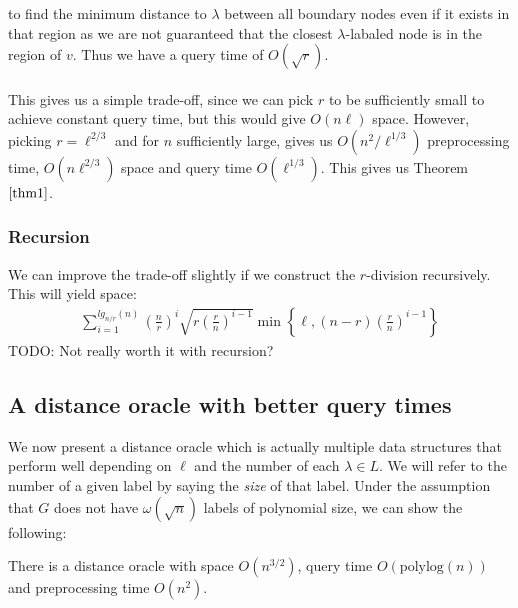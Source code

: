 to find the minimum distance to $\lambda$ between all boundary nodes even if it exists in
that region as we are not guaranteed that the closest $\lambda$-labaled node is in the
region of $v$. Thus we have a query time of $O(\sqrt{r})$. \\
\\
This gives us a simple trade-off, since we can pick $r$ to be sufficiently small to
achieve constant query time, but this would give $O(n\ell)$ space. However, picking
$r=\ell^{2/3}$ and for $n$ sufficiently large, gives us $O(n^2/\ell^{1/3})$ preprocessing time, $O(n\ell^{2/3})$ space and query time $O(\ell^{1/3})$. This gives us Theorem $\ref{thm1}$.

\subsubsection{Recursion}
We can improve the trade-off slightly if we construct the $r$-division recursively. This will
yield space:
\begin{align*}
  \sum_{i=1}^{lg_{n/r}(n)} \left(\frac{n}{r}\right)^i
  \sqrt{r\left(\frac{r}{n}\right)^{i-1}} \min
  \left\{\ell,\left(n-r\right)\left(\frac{r}{n}\right)^{i-1}\right\}
\end{align*}
TODO: Not really worth it with recursion?

\subsection{A distance oracle with better query times}\label{oracle2}
We now present a distance oracle which is actually multiple data structures that perform
well depending on $\ell$ and the number of each $\lambda\in L$. We will refer to the
number of a given label by saying the \textit{size} of that label. Under the assumption
that $G$ does not have $\omega(\sqrt{n})$ labels of polynomial size, we can show the
following:
\begin{thm}\label{thm2}
  There is a distance oracle with space $O(n^{3/2})$, query time $O(\text{polylog}(n))$ and
  preprocessing time $O(n^2)$.
\end{thm}

